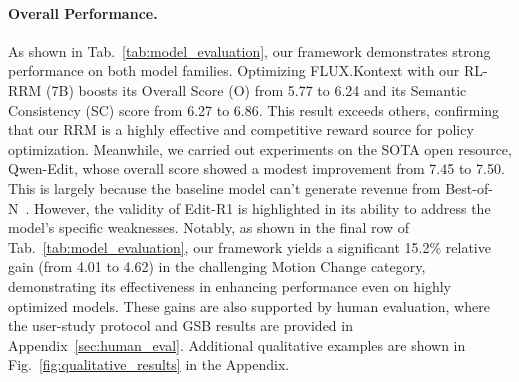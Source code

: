 \paragraph{Overall Performance.}
As shown in Tab.~\ref{tab:model_evaluation}, our framework demonstrates strong performance on both model families. Optimizing FLUX.Kontext with our RL-RRM (7B) boosts its Overall Score (O) from 5.77 to 6.24 and its Semantic Consistency (SC) score from 6.27 to 6.86. This result exceeds others, confirming that our RRM is a highly effective and competitive reward source for policy optimization.
Meanwhile, we carried out experiments on the SOTA open resource, Qwen-Edit, whose overall score showed a modest improvement from 7.45 to 7.50. This is largely because the baseline model can't generate revenue from Best-of-N~\cite{luo2025editscore}. However, the validity of Edit-R1 is highlighted in its ability to address the model's specific weaknesses. 
Notably, as shown in the final row of Tab.~\ref{tab:model_evaluation}, our framework yields a significant 15.2\% relative gain (from 4.01 to 4.62) in the challenging Motion Change category, demonstrating its effectiveness in enhancing performance even on highly optimized models. These gains are also supported by human evaluation, where the user-study protocol and GSB results are provided in Appendix~\ref{sec:human_eval}. Additional qualitative examples are shown in Fig.~\ref{fig:qualitative_results} in the Appendix.
